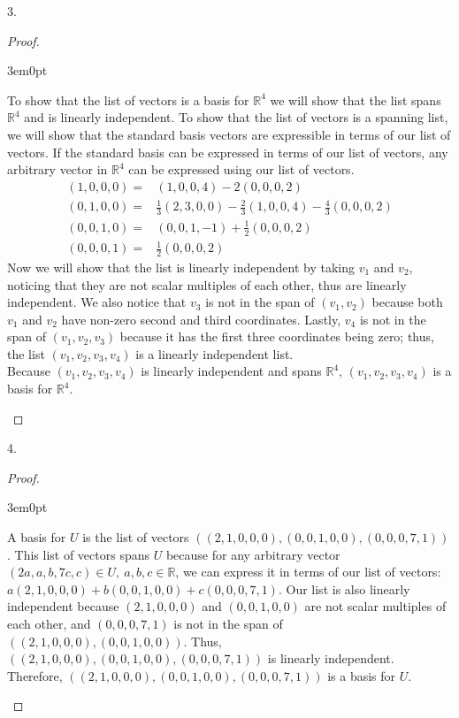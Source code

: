 \documentclass[11pt]{article}
\newcommand{\R}{\mathbb{R}}
\newenvironment{myproof}
{\begin{proof} \begin{adjustwidth}{3em}{0pt}$ $\par\nobreak\ignorespaces}
{\end{adjustwidth} \end{proof}}
\begin{document}
\begin{flushleft}
\newpage

3.

\begin{myproof}
To show that the list of vectors is a basis for $\R^4$ we will show that the list spans $\R^4$ and is linearly independent. To show that the list of vectors is a spanning list, we will show that the standard basis vectors are expressible in terms of our list of vectors. If the standard basis can be expressed in terms of our list of vectors, any arbitrary vector in $\R^4$ can be expressed using our list of vectors.
\begin{align*}
(1,0,0,0) = & (1,0,0,4) -2(0,0,0,2) \\
(0,1,0,0) = & \frac{1}{3}(2,3,0,0) - \frac{2}{3}(1,0,0,4) -\frac{4}{3}(0,0,0,2) \\
(0,0,1,0) = & (0,0,1,-1) + \frac{1}{2}(0,0,0,2) \\
(0,0,0,1) = & \frac{1}{2}(0,0,0,2)
\end{align*}
Now we will show that the list is linearly independent by taking $v_1$ and $v_2$, noticing that they are not scalar multiples of each other, thus are linearly independent. We also notice that $v_3$ is not in the span of $(v_1, v_2)$ because both $v_1$ and $v_2$ have non-zero second and third coordinates. Lastly, $v_4$ is not in the span of $(v_1, v_2, v_3)$ because it has the first three coordinates being zero; thus, the list $(v_1, v_2, v_3, v_4)$ is a linearly independent list. \\
\bigskip
Because $(v_1, v_2, v_3, v_4)$ is linearly independent and spans $\R^4$, $(v_1, v_2, v_3, v_4)$ is a basis for $\R^4$.
\end{myproof}

\newpage

4.

\begin{myproof}
A basis for $U$ is the list of vectors $((2,1,0,0,0), (0,0,1,0,0), (0,0,0,7,1))$. This list of vectors spans $U$ because for any arbitrary vector $(2a,a,b,7c,c) \in U, \ a,b,c \in \R$, we can express it in terms of our list of vectors: $a(2,1,0,0,0) + b(0,0,1,0,0) + c(0,0,0,7,1)$. Our list is also linearly independent because $(2,1,0,0,0)$ and $(0,0,1,0,0)$ are not scalar multiples of each other, and $(0,0,0,7,1)$ is not in the span of $((2,1,0,0,0), (0,0,1,0,0))$. Thus, $((2,1,0,0,0), (0,0,1,0,0), (0,0,0,7,1))$ is linearly independent. \\
\bigskip
Therefore, $((2,1,0,0,0), (0,0,1,0,0), (0,0,0,7,1))$ is a basis for $U$.
\end{myproof}


\end{flushleft}
\end{document}

